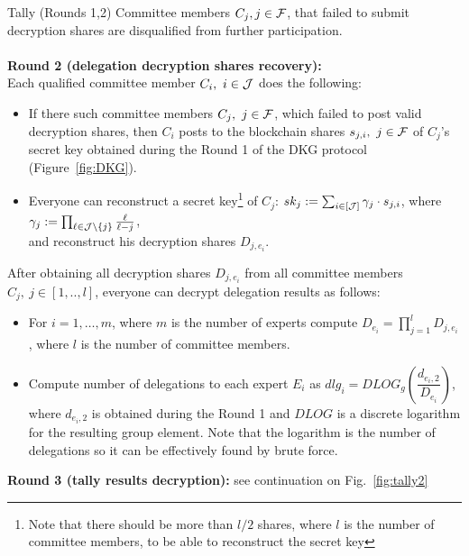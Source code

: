 \begin{boxfig}{\label{fig:tally1}Tally (Rounds 1,2)}{}
Committee members $C_j, j \in \mathcal{F}$, that failed to submit decryption shares are disqualified from further participation.
\\~\\
\textbf{Round 2 (delegation decryption shares recovery):}\\
Each qualified committee member $C_i,\ i \in \mathcal{J}$ does the following:
\begin{itemize}
    \item If there such committee members $C_j,\ j \in \FFF$, which failed to post valid decryption shares, then $C_i$ posts to the blockchain shares $s_{j,i},\ j \in \mathcal{F}$ of $C_j$'s secret key obtained during the Round 1 of the DKG protocol (Figure~\ref{fig:DKG}).
    \item Everyone can reconstruct a secret key\footnote{Note that there should be more than $l/2$ shares, where $l$ is the number of committee members, to be able to reconstruct the secret key} of $C_j$: $sk_j := \sum_{i\in[\mathcal{J}]} \gamma_{j} \cdot s_{j,i}$, where $\gamma_{j}:= \prod_{\ell\in \mathcal{J}\setminus \{j\} } \frac{\ell}{\ell-j}$,\\
    and reconstruct his decryption shares $D_{j,e_i}$.
\end{itemize}
\vspace*{2mm}
After obtaining all decryption shares $D_{j,e_i}$ from all committee members $C_j,\ j\in[1,..,l]$, everyone can decrypt delegation results as follows:
\begin{itemize}
    \item For $i = 1,\ldots, m$, where $m$ is the number of experts compute $D_{e_i}=\prod_{j=1}^{l} D_{j,e_i}$, where $l$ is the number of committee members.
    \item Compute number of delegations to each expert $E_i$ as $dlg_{i}=DLOG_g(\dfrac{d_{e_i,2}}{D_{e_i}})$, where $d_{e_i,2}$ is obtained during the Round 1 and $DLOG$ is a discrete logarithm for the resulting group element. Note that the logarithm is the number of delegations so it can be effectively found by brute force.\\
\end{itemize}
\textbf{Round 3 (tally results decryption):} see continuation on Fig.~\ref{fig:tally2}
\end{boxfig}

